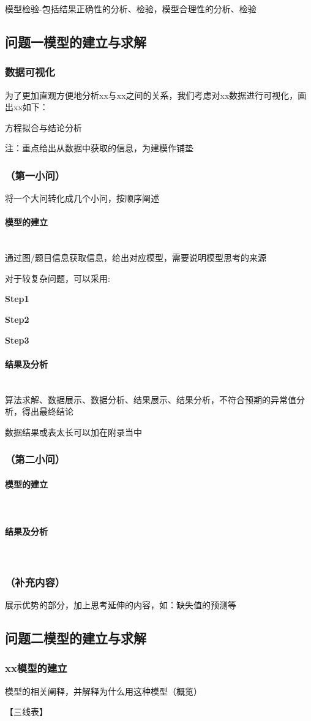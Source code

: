 \documentclass{ctexart}
\newcommand{\subsubsubsection}[1]{\paragraph{#1}\mbox{}\\}
\begin{document}
模型检验-包括结果正确性的分析、检验，模型合理性的分析、检验
\subsection{问题一模型的建立与求解}
\subsubsection{数据可视化}
为了更加直观方便地分析xx与xx之间的关系，我们考虑对xx数据进行可视化，画出xx如下：

方程拟合与结论分析

注：重点给出从数据中获取的信息，为建模作铺垫

\subsubsection{（第一小问）}
将一个大问转化成几个小问，按顺序阐述
\subsubsubsection{模型的建立}
通过图/题目信息获取信息，给出对应模型，需要说明模型思考的来源

对于较复杂问题，可以采用:

\textbf{Step1 $\quad$}

\textbf{Step2 $\quad$}

\textbf{Step3 $\quad$}

\subsubsubsection{结果及分析}
算法求解、数据展示、数据分析、结果展示、结果分析，不符合预期的异常值分析，得出最终结论

数据结果或表太长可以加在附录当中

\subsubsection{（第二小问）}
\subsubsubsection{模型的建立}
\subsubsubsection{结果及分析}
\subsubsection{（补充内容）}
展示优势的部分，加上思考延伸的内容，如：缺失值的预测等

\subsection{问题二模型的建立与求解}
\subsubsection{xx模型的建立}
模型的相关阐释，并解释为什么用这种模型（概览）

【三线表】
\end{document}
